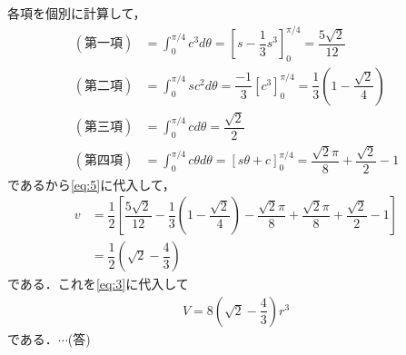 \documentclass[../../main.tex]{subfiles}
\begin{document}
各項を個別に計算して，
\begin{align}
  (\text{第一項})
  &= \int_0^{\pi/4}c^3d\theta=\left[s-\dfrac{1}{3}s^3\right]_0^{\pi/4}
  =\dfrac{5\sqrt{2}}{12} \\
  (\text{第二項})
  &=\int_0^{\pi/4}sc^2d\theta=\dfrac{-1}{3}[c^3]_0^{\pi/4}
  =\dfrac{1}{3}\left(1-\dfrac{\sqrt{2}}{4}\right) \\
  (\text{第三項})
  &=\int_0^{\pi/4}cd\theta=\dfrac{\sqrt{2}}{2}  \\
  (\text{第四項})
  &=\int_0^{\pi/4}c\theta d\theta=[s\theta+c]_0^{\pi/4}
  =\dfrac{\sqrt{2}\pi}{8}+\dfrac{\sqrt{2}}{2}-1
\end{align}
であるから\cref{eq:5}に代入して，
\begin{align}
  v
  &=\dfrac{1}{2}\left[\dfrac{5\sqrt{2}}{12}-\dfrac{1}{3}\left(1-\dfrac{\sqrt{2}}{4}\right)-\dfrac{\sqrt{2}\pi}{8}+\dfrac{\sqrt{2}\pi}{8}+\dfrac{\sqrt{2}}{2}-1 \right]    \\
  &=\dfrac{1}{2}\left(\sqrt{2}-\dfrac{4}{3}\right)
\end{align}
である．これを\cref{eq:3}に代入して
\begin{align}
  V=8\left(\sqrt{2}-\dfrac{4}{3}\right)r^3
\end{align}
である．$\cdots$(答)
\newpage
\end{document}
